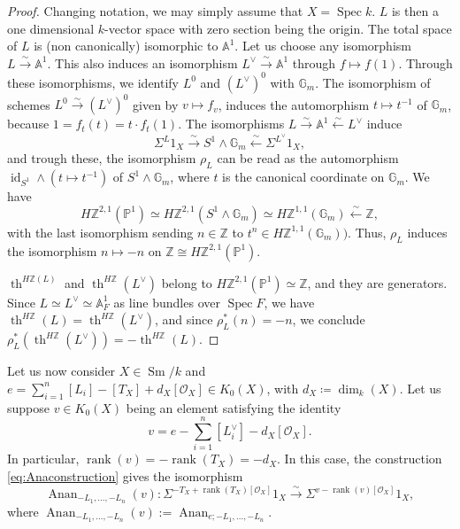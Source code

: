 \documentclass[10pt]{amsart}
\theoremstyle{definition}
\theoremstyle{plain}
\numberwithin{equation}{section}
\newcommand{\0}{\emptyset}
\newcommand{\sO}{{\mathcal O}}
\newcommand{\A}{{\mathbb A}}
\newcommand{\G}{{\mathbb G}}
\renewcommand{\P}{{\mathbb P}}
\newcommand{\Z}{{\mathbb Z}}
\newcommand{\Spec}{{\operatorname{Spec}}}
\newcommand{\Sm}{{\operatorname{Sm}}}
\renewcommand{\th}{{\operatorname{th}}}
\renewcommand{\dim}{{\operatorname{dim}}}
\newcommand{\rnk}{{\operatorname{rank}}}
\newcommand{\id}{{\operatorname{id}}}
\newcommand{\Anan}{{\operatorname{Anan}}}
\begin{document}
\begin{proof}
 Changing notation, we may simply assume that $X=\Spec k$. $L$ is then a one dimensional $k$-vector space with zero section being the origin. The total space of $L$ is (non canonically) isomorphic to $\mathbb{A}^1$. Let us choose any isomorphism $L\xrightarrow{\sim} \mathbb{A}^1$. This also induces an isomorphism $L^{\vee}\xrightarrow{\sim}\mathbb{A}^1$ through $f\mapsto f(1)$. Through these isomorphisms, we identify $L^0$ and $(L^{\vee})^0$ with $\mathbb{G}_m$. The isomorphism of schemes $L^0 \xrightarrow{\sim}(L^{\vee})^0$ given by $v \mapsto f_v$, induces the automorphism $t \mapsto t^{-1}$ of $\mathbb{G}_m$, because $1=f_t(t)=t\cdot f_t(1)$. The isomorphisms $L\xrightarrow{\sim}\mathbb{A}^1\xleftarrow{\sim}L^{\vee}$ induce
    $$\Sigma^L1_X \xrightarrow{\sim}S^1\wedge \mathbb{G}_m \xleftarrow{\sim} \Sigma^{L^{\vee}}1_X,$$
    and trough these, the isomorphism $\rho_L$ can be read as the automorphism $\id_{S^1}\wedge(t\mapsto t^{-1})$ of $S^1\wedge\G_m$, where $t$ is the canonical coordinate on $\G_m$. We have
    $$H\Z^{2,1}(\P^1) \simeq H\mathbb{Z}^{2,1}(S^1\wedge\G_m)\simeq  H\mathbb{Z}^{1,1} (\G_m) \xleftarrow{\sim} \mathbb{Z},$$
    with the last isomorphism sending $n\in\Z$ to $t^n\in H\mathbb{Z}^{1,1}(\G_m))$. Thus, $\rho_L$ induces the isomorphism $n\mapsto -n$ on $\Z\cong H\mathbb{Z}^{2,1}(\P^1)$.

    $\th^{H\mathbb{Z}(L)}$ and $\th^{H\mathbb{Z}}(L^{\vee})$ belong to $H\mathbb{Z}^{2,1}(\mathbb{P}^1)\simeq \mathbb{Z}$, and they are generators. Since $L\simeq L^\vee\simeq \A^1_F$ as line bundles over $\Spec F$, we have $\th^{H\mathbb{Z}}(L)=\th^{H\mathbb{Z}}(L^{\vee})$, and since $\rho_L^*(n)=-n$, we conclude $\rho_L^*(\th^{H\mathbb{Z}}(L^{\vee}))= -\th^{H\mathbb{Z}}(L)$.
\end{proof}

Let us now consider $X \in \Sm/k$ and $e=\sum_{i=1}^n[L_i]-[T_X]+d_X[\sO_X] \in K_0(X)$, with $d_X \coloneqq \dim_k(X)$. Let us suppose $v \in K_0(X)$ being an element satisfying the identity
\begin{equation}
\label{eq:comparisontangentbundle}
    v=e - \sum_{i=1}^n[L_i^\vee] - d_X[\sO_X].
\end{equation}
In particular, $\rnk(v)=-\rnk(T_X)=-d_X$. In this case, the construction \eqref{eq:Anaconstruction} gives the isomorphism
\begin{equation}
\label{eq:anatwist}
    \Anan_{-L_1, \ldots, -L_n}(v): \Sigma^{-T_X+\rnk(T_X)[\sO_X]}1_X \xrightarrow{\sim} \Sigma^{v-\rnk(v)[\sO_X]}1_X,
\end{equation}
where $\Anan_{-L_1, \ldots, -L_n}(v):=\Anan_{e;-L_1, \ldots, -L_n}$.
\end{document}
